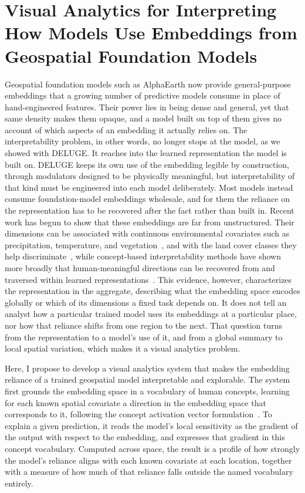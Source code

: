 \section{Visual Analytics for Interpreting How Models Use Embeddings from Geospatial Foundation Models}
Geospatial foundation models such as AlphaEarth now provide general-purpose embeddings that a growing number of predictive models consume in place of hand-engineered features.
%
Their power lies in being dense and general, yet that same density makes them opaque, and a model built on top of them gives no account of which aspects of an embedding it actually relies on.
%
The interpretability problem, in other words, no longer stops at the model, as we showed with DELUGE. It reaches into the learned representation the model is built on.
%
DELUGE keeps its own use of the embedding legible by construction, through modulators designed to be physically meaningful, but interpretability of that kind must be engineered into each model deliberately. Most models instead consume foundation-model embeddings wholesale, and for them the reliance on the representation has to be recovered after the fact rather than built in.
%
Recent work has begun to show that these embeddings are far from unstructured. Their dimensions can be associated with continuous environmental covariates such as precipitation, temperature, and vegetation~\cite{rahman2026alphaearth}, and with the land cover classes they help discriminate~\cite{benavides2026earth}, while concept-based interpretability methods have shown more broadly that human-meaningful directions can be recovered from and traversed within learned representations~\cite{kim2018tcav}.
%
This evidence, however, characterizes the representation in the aggregate, describing what the embedding space encodes globally or which of its dimensions a fixed task depends on. It does not tell an analyst how a particular trained model uses its embeddings at a particular place, nor how that reliance shifts from one region to the next. That question turns from the representation to a model's use of it, and from a global summary to local spatial variation, which makes it a visual analytics problem.

Here, I propose to develop a visual analytics system that makes the embedding reliance of a trained geospatial model interpretable and explorable.
%
The system first grounds the embedding space in a vocabulary of human concepts, learning for each known spatial covariate a direction in the embedding space that corresponds to it, following the concept activation vector formulation~\cite{kim2018tcav}.
%
To explain a given prediction, it reads the model's local sensitivity as the gradient of the output with respect to the embedding, and expresses that gradient in this concept vocabulary.
%
Computed across space, the result is a profile of how strongly the model's reliance aligns with each known covariate at each location, together with a measure of how much of that reliance falls outside the named vocabulary entirely.

